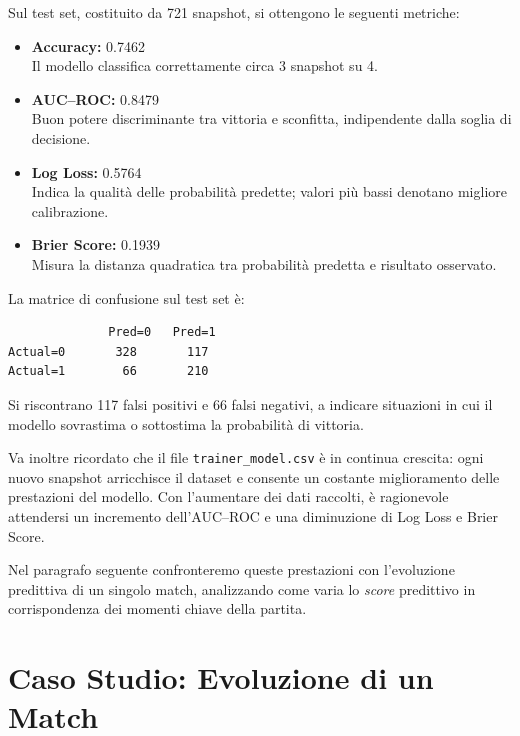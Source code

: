 \documentclass[a4paper,12pt]{report}
\begin{document}
Sul test set, costituito da 721 snapshot, si ottengono le seguenti metriche:

\begin{itemize}
  \item \textbf{Accuracy:} 0.7462 \\
    Il modello classifica correttamente circa 3 snapshot su 4.
  \item \textbf{AUC–ROC:} 0.8479 \\
    Buon potere discriminante tra vittoria e sconfitta, indipendente dalla soglia di decisione.
  \item \textbf{Log Loss:} 0.5764 \\
    Indica la qualità delle probabilità predette; valori più bassi denotano migliore calibrazione.
  \item \textbf{Brier Score:} 0.1939 \\
    Misura la distanza quadratica tra probabilità predetta e risultato osservato.
\end{itemize}

\noindent La matrice di confusione sul test set è:

\begin{verbatim}
              Pred=0   Pred=1
Actual=0       328       117
Actual=1        66       210
\end{verbatim}

Si riscontrano 117 falsi positivi e 66 falsi negativi, a indicare situazioni in cui il modello sovrastima o sottostima la probabilità di vittoria.

\medskip

\noindent Va inoltre ricordato che il file \texttt{trainer\_model.csv} è in continua crescita: ogni nuovo snapshot arricchisce il dataset e consente un costante miglioramento delle prestazioni del modello. Con l’aumentare dei dati raccolti, è ragionevole attendersi un incremento dell’AUC–ROC e una diminuzione di Log Loss e Brier Score.

\medskip

\noindent Nel paragrafo seguente confronteremo queste prestazioni con l’evoluzione predittiva di un singolo match, analizzando come varia lo \textit{score} predittivo in corrispondenza dei momenti chiave della partita.



\section{ Caso Studio: Evoluzione di un Match}
\end{document}
